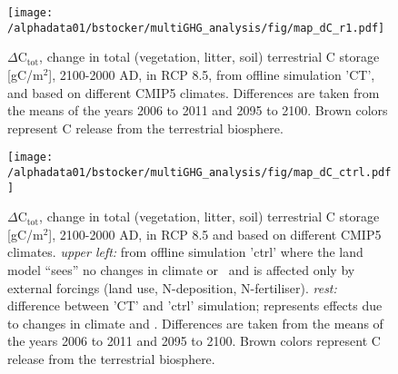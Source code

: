 \documentclass{myreport}
\begin{document}
\begin{figure}[ht!]
  \texttt{[image: /alphadata01/bstocker/multiGHG\_analysis/fig/map\_dC\_r1.pdf]}
\caption{$\Delta$C$_{\text{tot}}$, change in total (vegetation, litter, soil) terrestrial C storage [gC/m$^2$], 2100-2000 AD, in RCP 8.5, from offline simulation 'CT', and based on different CMIP5 climates. Differences are taken from the means of the years 2006 to 2011 and 2095 to 2100. Brown colors represent C release from the terrestrial biosphere.}
\label{fig:dC_CT}
\end{figure}


\begin{figure}[ht!]
  \texttt{[image: /alphadata01/bstocker/multiGHG\_analysis/fig/map\_dC\_ctrl.pdf]}
\caption{$\Delta$C$_{\text{tot}}$, change in total (vegetation, litter, soil) terrestrial C storage [gC/m$^2$], 2100-2000 AD, in RCP 8.5 and based on different CMIP5 climates. {\it upper left: } from offline simulation 'ctrl' where the land model ``sees'' no changes in climate or \coo\ and is affected only by external forcings (land use, N-deposition, N-fertiliser). {\it rest: } difference between 'CT' and 'ctrl' simulation; represents effects due to changes in climate and \coo . Differences are taken from the means of the years 2006 to 2011 and 2095 to 2100. Brown colors represent C release from the terrestrial biosphere.}
\label{fig:dC_ctrl}
\end{figure}


\end{document}
